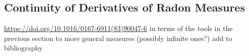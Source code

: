 \documentclass{book}
\begin{document}
	
	
	
	
	
	
	
	
	
	
	
	
	
	
	
	
	
	
	
	
	
	
	
	
	
	
	
	
	
	
	
	
	
	
	
	
	
	
	
	
	
	
	
	
	
	
	
	
	
	
	
	
	\subsection{Continuity of Derivatives of Radon Measures}
	
	 \href{https://doi.org/10.1016/0167-6911(83)90047-6}{https://doi.org/10.1016/0167-6911(83)90047-6} in terms of the tools in the previous section to more general measures (possibly infinite ones?)  add to bibliography
	
	
	
	
	
	
	
	
	
	
	
	
	
	
	
	
	
	
	
	
	
	
	
	
	
	
	
	
	
	
	
	
	
	
\end{document}
